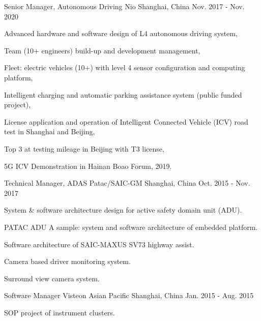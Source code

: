 \documentclass[../resume_xin.tex]{subfiles}
\begin{document}
\begin{cventries}
  \cventry
    {Senior Manager, Autonomous Driving} %
    {Nio} %
    {Shanghai, China} %
    {Nov. 2017 - Nov. 2020} %
    {
      \begin{cvitems}
        \item Advanced hardware and software design of L4 autonomous driving system,
        \item Team (10+ engineers) build-up and development management,
        \item Fleet: electric vehicles (10+) with level 4 sensor configuration and computing platform,
        \item Intelligent charging and automatic parking assistance system (public funded project),
        \item License application and operation of Intelligent Connected Vehicle (ICV) road test in Shanghai and Beijing,
        \item Top 3 at testing mileage in Beijing with T3 license,
        \item 5G ICV Demonstration in Hainan Boao Forum, 2019.
      \end{cvitems}
    }

  \cventry
    {Technical Manager, ADAS} %
    {Patac/SAIC-GM} %
    {Shanghai, China} %
    {Oct. 2015 - Nov. 2017} %
    {
      \begin{cvitems}
        \item System \& software architecture design for active safety domain unit (ADU).
        \item PATAC ADU A sample: system and software architecture of embedded platform.
        \item Software architecture of SAIC-MAXUS SV73 highway assist.
        \item Camera based driver monitoring system.
        \item Surround view camera system.
      \end{cvitems}
    }


  \cventry
    {Software Manager} %
    {Visteon Asian Pacific} %
    {Shanghai, China} %
    {Jan. 2015 - Aug. 2015} %
    {
      \begin{cvitems}
        \item SOP project of instrument clusters.
      \end{cvitems}
    }


\end{cventries}
\end{document}
